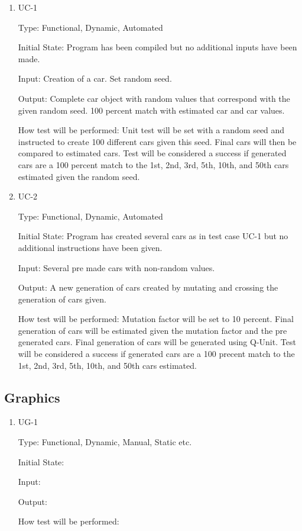 \documentclass[12pt, titlepage]{article}
\begin{document}
\begin{enumerate}

\item{UC-1\\}

Type: Functional, Dynamic, Automated
					
Initial State: Program has been compiled but no additional inputs have been made.
					
Input: Creation of a car. Set random seed.
					
Output: Complete car object with random values that correspond with the given random seed. 100 percent match with estimated car and car values.
					
How test will be performed: Unit test will be set with a random seed and instructed to create 100 different cars given this seed. Final cars will then be compared to estimated cars. Test will be considered a success if generated cars are a 100 percent match to the 1st, 2nd, 3rd, 5th, 10th, and 50th cars estimated given the random seed.
					
\item{UC-2\\}

Type: Functional, Dynamic, Automated
					
Initial State: Program has created several cars as in test case UC-1 but no additional instructions have been given.
					
Input: Several pre made cars with non-random values.
					
Output: A new generation of cars created by mutating and crossing the generation of cars given.
					
How test will be performed: Mutation factor will be set to 10 percent. Final generation of cars will be estimated given the mutation factor and the pre generated cars. Final generation of cars will be generated using Q-Unit. Test will be considered a success if generated cars are a 100 precent match to the 1st, 2nd, 3rd, 5th, 10th, and 50th cars estimated.

\end{enumerate}

\subsection{Graphics}

\begin{enumerate}

\item{UG-1\\}

Type: Functional, Dynamic, Manual, Static etc.
					
Initial State: 
					
Input: 
					
Output: 
					
How test will be performed: 

\end{enumerate}
	
\end{document}
